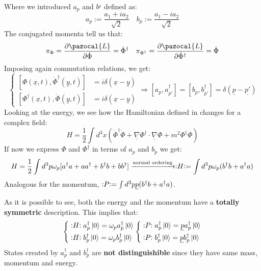 \documentclass[../main.tex]{subfiles}
\begin{document}
Where we introduced $a_p$ and $b^_p$ defined as:
\[
a_p:=\frac{a_1+ia_2}{\sqrt{2}} \quad
b_p:=\frac{a_1-ia_2}{\sqrt{2}}
\]
The conjugated momenta tell us that:
\[
\pi_\Phi=\frac{\partial\pazocal{L}}{\partial\Dot{\Phi}}=\Dot{\Phi}^\dagger \quad 
\pi_{\Phi^\dagger}=\frac{\partial\pazocal{L}}{\partial\Dot{\Phi}^\dagger}=\Dot{\Phi}
\]
Imposing again commutation relations, we get:
\[
\left\{
\begin{aligned}
[\Phi(\underline{x},t),\Dot{\Phi}^\dagger(\underline{y},t)]&=i\delta(\underline{x}-\underline{y})\\
[\Phi^\dagger(\underline{x},t),\Dot{\Phi}(\underline{y},t)]&=i\delta(\underline{x}-\underline{y})
\end{aligned}
\right.
\Rightarrow
[a_p,a^\dagger_{p'}]=[b_p,b^\dagger_{p'}]=\delta(\underline{p}-\underline{p'})
\]
Looking at the energy, we see how the Hamiltonian defined in  changes for a complex field:
\[
H=\frac{1}{2}\int d^3x\left(\Dot{\Phi}^\dagger\Dot{\Phi}+\underline{\nabla}\Phi^\dagger\cdot\underline{\nabla}\Phi+m^2\Phi^\dagger\Phi\right)
\]
If now we express $\Phi$ and $\Phi^\dagger$ in terms of $a_p$ and $b_p$ we get:
\[
H=\frac{1}{2}\int d^3p\omega_p[a^\dagger a+aa^\dagger+b^\dagger b+bb^\dagger]\xrightarrow[]{\text{normal ordering}}\vcentcolon\mathrel{H}\vcentcolon=\int d^3p\omega_p(b^\dagger b+a^\dagger a)
\]
Analogous for the momentum, $\vcentcolon\mathrel{P}\vcentcolon=\int d^3p\underline{p}(b^\dagger b+a^\dagger a)$. 

As it is possible to see, both the energy and the momentum have a \textbf{totally symmetric} description. This implies that:
\[
\left\{
\begin{aligned}
&\vcentcolon\mathrel{H}\vcentcolon a^\dagger_p\ket{0}=\omega_pa^\dagger_p\ket{0}\\ &\vcentcolon\mathrel{H}\vcentcolon b^\dagger_p\ket{0}=\omega_pb^\dagger_p\ket{0}\end{aligned}
\right.
\left\{
\begin{aligned}
&\vcentcolon\mathrel{P}\vcentcolon a^\dagger_p\ket{0}=\underline{p}a^\dagger_p\ket{0}\\
&\vcentcolon\mathrel{P}\vcentcolon b^\dagger_p\ket{0}=\underline{p}b^\dagger_p\ket{0}
\end{aligned}
\right.
\]
States created by $a^\dagger_p$ and $b^\dagger_p$ are \textbf{not distinguishible} since they have same mass, momentum and energy. 
\end{document}
